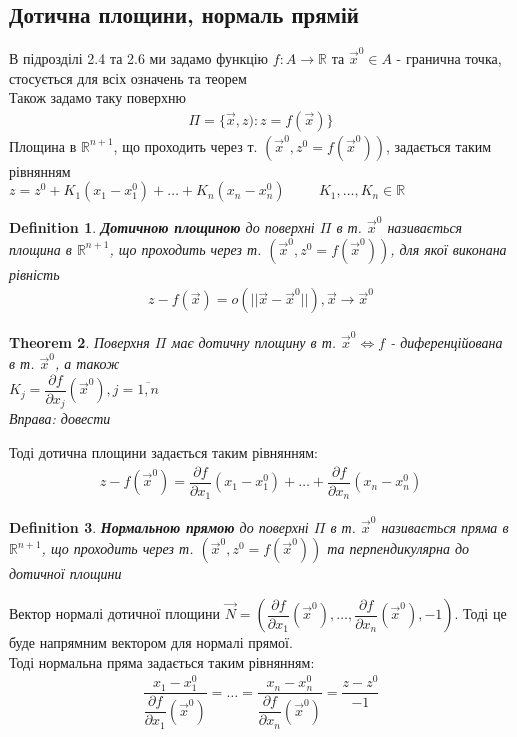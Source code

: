 \documentclass[a4paper, 14pt]{extarticle}
\def\departial#1#2{\dfrac{\partial {#1}}{\partial {#2}}}
\theoremstyle{theoremdd}
\newtheorem{theorem}{Theorem}[subsection]
\theoremstyle{theoremdd}
\newtheorem{definition}[theorem]{Definition}
\theoremstyle{theoremdd}
\theoremstyle{theoremdd}
\theoremstyle{theoremdd}
\theoremstyle{theoremdd}
\theoremstyle{theoremdd}
\begin{document}
\subsection{Дотична площини, нормаль прямій}
В підрозділі 2.4 та 2.6 ми задамо функцію $f: A \to \mathbb{R}$ та $\vec{x}^0 \in A$ - гранична точка, стосується для всіх означень та теорем\\
Також задамо таку поверхню
\begin{align*}
\Pi = \{\vec{x},z): z = f(\vec{x}) \}
\end{align*}
Площина в $\mathbb{R}^{n+1}$, що проходить через т. $(\vec{x}^0, z^0 = f(\vec{x}^0))$, задається таким рівнянням\\
$z = z^0 + K_1(x_1-x_1^0) + \dots + K_n(x_n-x_n^0) \hspace{1cm} K_1,\dots,K_n \in \mathbb{R}$
\begin{definition}
\textbf{Дотичною площиною} до поверхні $\Pi$ в т. $\vec{x}^0$ називається площина в $\mathbb{R}^{n+1}$, що проходить через т. $(\vec{x}^0, z^0 = f(\vec{x}^0))$, для якої виконана рівність
\begin{align*}
z - f(\vec{x}) = o(||\vec{x}-\vec{x}^0||), \vec{x} \to \vec{x}^0
\end{align*}
\end{definition}

\begin{theorem}
Поверхня $\Pi$ має дотичну площину в т. $\vec{x}^0 \iff f$ - диференційована в т. $\vec{x}^0$, а також\\
$K_j = \departial{f}{x_j}(\vec{x}^0), j=\overline{1,n}$\\
\textit{Вправа: довести}
\end{theorem}

Тоді дотична площини задається таким рівнянням:
\begin{align*}
z - f(\vec{x}^0) = \departial{f}{x_1}(x_1-x_1^0) + \dots + \departial{f}{x_n}(x_n-x_n^0)
\end{align*}

\begin{definition}
\textbf{Нормальною прямою} до поверхні $\Pi$ в т. $\vec{x}^0$ називається пряма в $\mathbb{R}^{n+1}$, що проходить через т. $(\vec{x}^0, z^0 = f(\vec{x}^0))$ та перпендикулярна до дотичної площини
\end{definition}
Вектор нормалі дотичної площини $\vec{N} = \left( \departial{f}{x_1}(\vec{x}^0), \dots, \departial{f}{x_n}(\vec{x}^0), -1  \right)$. Тоді це буде напрямним вектором для нормалі прямої. \\
Тоді нормальна пряма задається таким рівнянням:
\begin{align*}
\dfrac{x_1 - x_1^0}{\departial{f}{x_1}(\vec{x}^0)} = \dots = \dfrac{x_n - x_n^0}{\departial{f}{x_n}(\vec{x}^0)} = \dfrac{z-z^0}{-1}
\end{align*}
\end{document}
